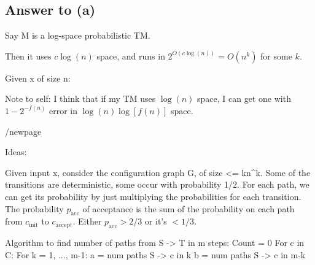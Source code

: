 \documentclass{article}
\renewcommand{\P}{\mathbf{P}}
\def \BPL{{\mathbf{BPL}}}
\begin{document}
\subsection*{Answer to (a)}

Say M is a log-space probabilistic TM.

Then it uses $c \log(n)$ space, and runs in $2^{O(c \log(n))} = O(n^k)$ for some $k$.

Given x of size n:












Note to self: I think that if my TM uses $\log(n)$ space, I can get one with $1 - 2^{-f(n)}$ error in $\log(n) \log [f(n)]$ space.

/newpage

Ideas:

Given input x, consider the configuration graph G, of size <= kn^k.
Some of the transitions are deterministic, some occur with probability 1/2.
For each path, we can get its probability by just multiplying the probabilities for each transition.
The probability $p_\text{acc}$ of acceptance is the sum of the probability on each path from $c_\text{init}$ to $c_\text{accept}$.
Either $p_\text{acc} > 2/3$ or it's $ < 1/3$.


\newpage

Algorithm to find number of paths from S -> T in m steps:
Count = 0
For c in C:
  For k = 1, ..., m-1:
    a = num paths S -> c in k
	b = num paths S -> c in m-k
\end{document}
